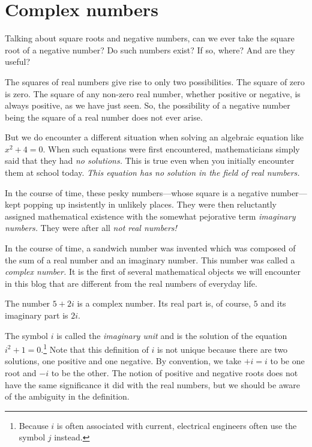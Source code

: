 \documentclass[
  a4paper,
]{article}
\begin{document}
\hypertarget{complex-numbers}{%
\section{Complex numbers}\label{complex-numbers}}

Talking about square roots and negative numbers, can we ever take the
square root of a negative number? Do such numbers exist? If so, where?
And are they useful?

The squares of real numbers give rise to only two possibilities. The
square of zero is zero. The square of any non-zero real number, whether
positive or negative, is always positive, as we have just seen. So, the
possibility of a negative number being the square of a real number does
not ever arise.

But we do encounter a different situation when solving an algebraic
equation like \(x^{2} + 4 = 0\). When such equations were first
encountered, mathematicians simply said that they had \emph{no
solutions.} This is true even when you initially encounter them at
school today. \emph{This equation has no solution in the field of real
numbers.}

In the course of time, these pesky numbers---whose square is a negative
number---kept popping up insistently in unlikely places. They were then
reluctantly assigned mathematical existence with the somewhat pejorative
term \emph{imaginary numbers.} They were after all \emph{not real
numbers!}

In the course of time, a sandwich number was invented which was composed
of the sum of a real number and an imaginary number. This number was
called a \emph{complex number.} It is the first of several mathematical
objects we will encounter in this blog that are different from the real
numbers of everyday life.

The number \(5 + 2i\) is a complex number. Its real part is, of course,
\(5\) and its imaginary part is \(2i\).

The symbol \(i\) is called the \emph{imaginary unit} and is the solution
of the equation \(i^2 + 1 = 0\).\footnote{Because \(i\) is often
  associated with current, electrical engineers often use the symbol
  \(j\) instead.} Note that this definition of \(i\) is not unique
because there are two solutions, one positive and one negative. By
convention, we take \(+i = i\) to be one root and \(-i\) to be the
other. The notion of positive and negative roots does not have the same
significance it did with the real numbers, but we should be aware of the
ambiguity in the definition.
\end{document}

